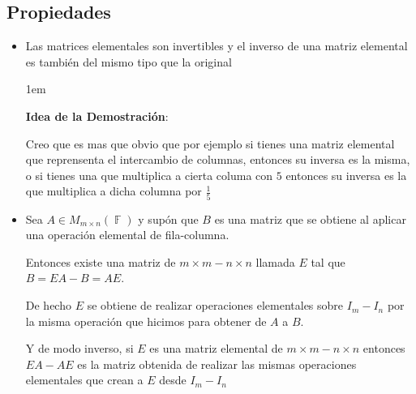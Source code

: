 \documentclass[12pt, fleqn]{report}                             %
\newenvironment{SmallIndentation}[1][0.75em]                    %
        {\begin{adjustwidth}{#1}{}\begin{footnotesize}}             %
        {\end{footnotesize}\end{adjustwidth}}                       %
\theoremstyle{break}                                            %
\DeclareMathOperator \GenericField {\mathbb{F}}                 %
\begin{document}
            \clearpage
            \subsection{Propiedades}

            \begin{itemize}
                
                \item 
                    Las matrices elementales son invertibles y el inverso de una matriz elemental es 
                    también del mismo tipo que la original

                    \begin{SmallIndentation}[1em]
                        \textbf{Idea de la Demostración}:
                            
                        Creo que es mas que obvio que por ejemplo si tienes una matriz elemental que reprensenta
                        el intercambio de columnas, entonces su inversa es la misma, o si tienes una que multiplica
                        a cierta columa con $5$ entonces su inversa es la que multiplica a dicha columna por $\frac{1}{5}$

                    \end{SmallIndentation}

                \item
                    Sea $A \in M_{m \times n}(\GenericField)$ y supón que $B$ es una matriz
                    que se obtiene al aplicar una operación elemental de fila-columna.

                    Entonces existe una matriz de $m \times m-n \times n$ llamada $E$
                    tal que $B= EA - B = AE$.

                    De hecho $E$ se obtiene de realizar operaciones elementales sobre 
                    $I_m - I_n$ por la misma operación que hicimos para obtener de $A$
                    a $B$.

                    Y de modo inverso, si $E$ es una matriz elemental de 
                    $m \times m-n \times n$ entonces $EA - AE$ es la matriz obtenida 
                    de realizar las mismas operaciones elementales que crean a $E$ desde
                    $I_m - I_n$ 


\end{itemize}
\end{document}
